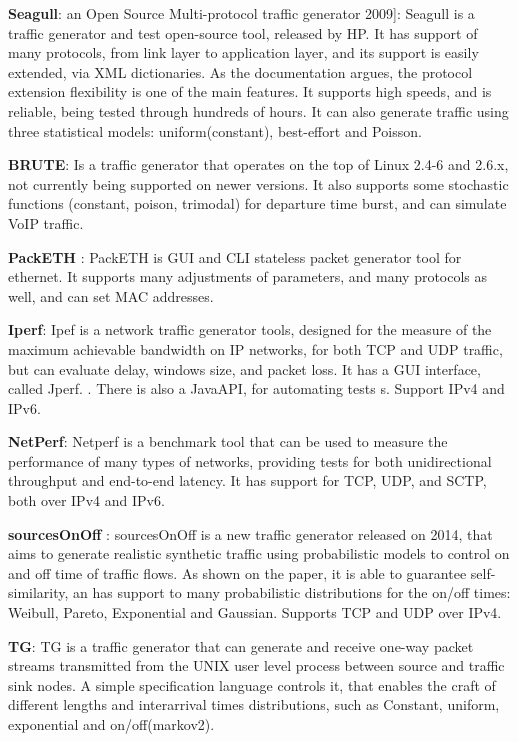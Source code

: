\textbf{Seagull}\cite{wp-seagull}\cite{web-seagull}: an Open Source Multi-protocol traffic generator 2009]: Seagull is a traffic generator and test open-source tool, released by HP. 
It has support of many protocols, from link layer to application layer, and its support is easily extended, via XML dictionaries. As the documentation argues, the protocol extension flexibility is one of the main features. It supports high speeds, and is reliable, being tested through hundreds of hours. 
It can also generate traffic using three statistical models: uniform(constant), best-effort and Poisson. 


\textbf{BRUTE}\cite{web-brute}: Is a traffic generator that operates on the top of Linux 2.4-6 and 2.6.x, not currently being supported on newer versions. It also supports some stochastic functions (constant, poison, trimodal) for departure time burst, and can simulate VoIP traffic.


\textbf{PackETH} \cite{web-packeth}: PackETH is GUI and CLI stateless packet generator tool for ethernet. It supports many adjustments of parameters, and many protocols as well, and can set MAC addresses.  

\textbf{Iperf}\cite{web-iperf}: Ipef is a network traffic generator tools, designed for the measure of the maximum achievable bandwidth on IP networks, for both TCP and UDP traffic, but can evaluate delay, windows size, and packet loss. It has a GUI interface, called Jperf\cite{web-jperf}. . There is also a JavaAPI, for automating tests s\cite{jperf-git}. Support IPv4 and IPv6.


\textbf{NetPerf}\cite{web-netperf}: Netperf is a benchmark tool that can be used to measure the performance of many types of networks, providing tests for both unidirectional throughput and end-to-end latency. It has support for TCP, UDP, and SCTP, both over IPv4 and IPv6. 


\textbf{sourcesOnOff}\cite{sourcesonoff-paper} \cite{web-sourcesonoff}:  sourcesOnOff is a new traffic generator released on 2014, that aims to generate realistic synthetic traffic using probabilistic models to control on and off time of traffic flows. As shown on the paper, it is able to guarantee self-similarity, an has support to many probabilistic distributions for the on/off times: Weibull, Pareto, Exponential and Gaussian. Supports TCP and UDP over IPv4.


\textbf{TG}\cite{web-tg}: TG is a traffic generator that can generate and receive one-way packet streams transmitted from the UNIX user level process between source and traffic sink nodes. A simple specification language controls it, that enables the craft of different lengths and interarrival times distributions, such as Constant, uniform, exponential and on/off(markov2). 


